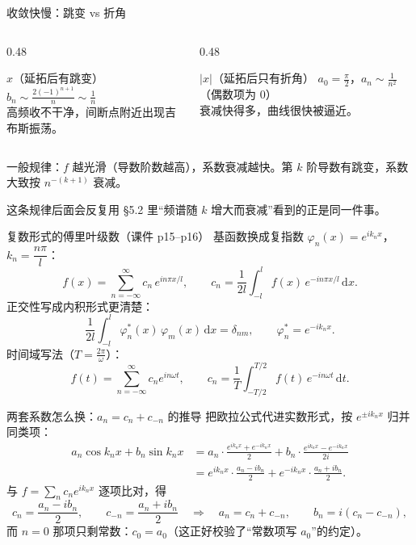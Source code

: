 \documentclass[aspectratio=169,10pt]{beamer}
\begin{document}
\begin{frame}{收敛快慢：跳变 vs 折角}
  \begin{columns}[t]
    \begin{column}{0.48\textwidth}
      \begin{block}{$x$（延拓后有跳变）}
        \small $b_n\sim\frac{2(-1)^{n+1}}{n}\sim\frac{1}{n}$\\[2pt]
        高频收不干净，间断点附近出现吉布斯振荡。
      \end{block}
    \end{column}
    \begin{column}{0.48\textwidth}
      \begin{block}{$|x|$（延拓后只有折角）}
        \small $a_0=\frac{\pi}{2}$，$a_n\sim\frac{1}{n^{2}}$（偶数项为 0）\\[2pt]
        衰减快得多，曲线很快被逼近。
      \end{block}
    \end{column}
  \end{columns}
  \vspace{6pt}
  {\small 一般规律：$f$ 越光滑（导数阶数越高），系数衰减越快。第 $k$ 阶导数有跳变，系数大致按 $n^{-(k+1)}$ 衰减。}
  \vspace{4pt}
  \begin{block}{这条规律后面会反复用}
    \small §5.2 里“频谱随 $k$ 增大而衰减”看到的正是同一件事。
  \end{block}
\end{frame}

\begin{frame}{复数形式的傅里叶级数（课件 p15--p16）}
  {\small 基函数换成复指数 $\varphi_n(x)=e^{ik_nx}$，$k_n=\dfrac{n\pi}{l}$：}
  \[
    f(x)=\sum_{n=-\infty}^{\infty}c_n\,e^{i n\pi x/l},\qquad
    c_n=\frac{1}{2l}\int_{-l}^{l}f(x)\,e^{-i n\pi x/l}\,\mathrm{d}x .
  \]
  {\small 正交性写成内积形式更清楚：}
  \[
    \frac{1}{2l}\int_{-l}^{l}\varphi_n^{*}(x)\,\varphi_m(x)\,\mathrm{d}x=\delta_{nm},
    \qquad \varphi_n^{*}=e^{-ik_nx}.
  \]
  {\small 时间域写法（$T=\frac{2\pi}{\omega}$）：}
  \[
    f(t)=\sum_{n=-\infty}^{\infty}c_n e^{in\omega t},\qquad
    c_n=\frac{1}{T}\int_{-T/2}^{T/2}f(t)\,e^{-in\omega t}\,\mathrm{d}t .
  \]
\end{frame}

\begin{frame}{两套系数怎么换：$a_n=c_n+c_{-n}$ 的推导}
  {\small 把欧拉公式代进实数形式，按 $e^{\pm ik_nx}$ 归并同类项：}
  \begin{align*}
    a_n\cos k_nx+b_n\sin k_nx
    &=a_n\cdot\frac{e^{ik_nx}+e^{-ik_nx}}{2}
      +b_n\cdot\frac{e^{ik_nx}-e^{-ik_nx}}{2i}\\
    &=e^{ik_nx}\cdot\frac{a_n-i b_n}{2}
      +e^{-ik_nx}\cdot\frac{a_n+i b_n}{2}.
  \end{align*}
  {\small 与 $f=\sum_n c_ne^{ik_nx}$ 逐项比对，得}
  \[
    c_n=\frac{a_n-i b_n}{2},\qquad c_{-n}=\frac{a_n+i b_n}{2}
    \quad\Longrightarrow\quad
    a_n=c_n+c_{-n},\qquad b_n=i\left(c_n-c_{-n}\right),
  \]
  {\small 而 $n=0$ 那项只剩常数：$c_0=a_0$（这正好校验了“常数项写 $a_0$”的约定）。}
\end{frame}
\end{document}
